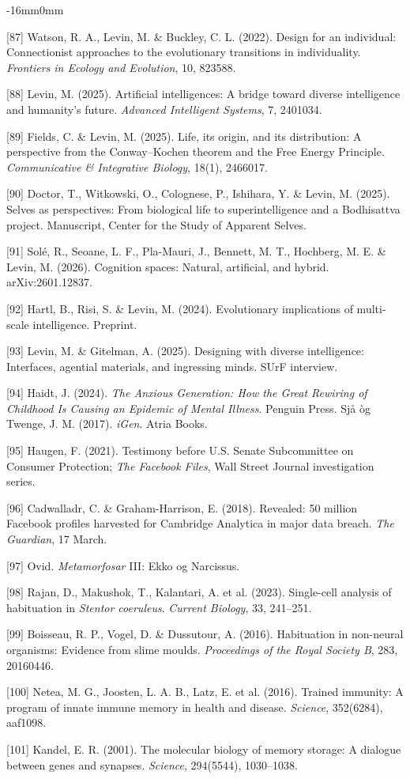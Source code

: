 \documentclass[10pt,oneside]{book}
\newcommand{\refentry}[1]{%
  \par\addvspace{0pt}%
  \begingroup\footnotesize\linespread{0.92}\selectfont
  \noindent\hangindent=4mm\hangafter=1 #1\par%
  \endgroup
}
\newenvironment{widebody}{%
  \begin{adjustwidth}{-16mm}{0mm}%
}{%
  \end{adjustwidth}%
}
\begin{document}
\begin{widebody}
\refentry{[87] Watson, R. A., Levin, M. \& Buckley, C. L. (2022). Design for an individual: Connectionist approaches to the evolutionary transitions in individuality. \textit{Frontiers in Ecology and Evolution}, 10, 823588.}
\refentry{[88] Levin, M. (2025). Artificial intelligences: A bridge toward diverse intelligence and humanity's future. \textit{Advanced Intelligent Systems}, 7, 2401034.}
\refentry{[89] Fields, C. \& Levin, M. (2025). Life, its origin, and its distribution: A perspective from the Conway--Kochen theorem and the Free Energy Principle. \textit{Communicative \& Integrative Biology}, 18(1), 2466017.}
\refentry{[90] Doctor, T., Witkowski, O., Colognese, P., Ishihara, Y. \& Levin, M. (2025). Selves as perspectives: From biological life to superintelligence and a Bodhisattva project. Manuscript, Center for the Study of Apparent Selves.}
\refentry{[91] Sol{\'e}, R., Seoane, L. F., Pla-Mauri, J., Bennett, M. T., Hochberg, M. E. \& Levin, M. (2026). Cognition spaces: Natural, artificial, and hybrid. arXiv:2601.12837.}
\refentry{[92] Hartl, B., Risi, S. \& Levin, M. (2024). Evolutionary implications of multi-scale intelligence. Preprint.}
\refentry{[93] Levin, M. \& Gitelman, A. (2025). Designing with diverse intelligence: Interfaces, agential materials, and ingressing minds. SUrF interview.}
\refentry{[94] Haidt, J. (2024). \textit{The Anxious Generation: How the Great Rewiring of Childhood Is Causing an Epidemic of Mental Illness}. Penguin Press. Sjå òg Twenge, J. M. (2017). \textit{iGen}. Atria Books.}
\refentry{[95] Haugen, F. (2021). Testimony before U.S. Senate Subcommittee on Consumer Protection; \textit{The Facebook Files}, Wall Street Journal investigation series.}
\refentry{[96] Cadwalladr, C. \& Graham-Harrison, E. (2018). Revealed: 50 million Facebook profiles harvested for Cambridge Analytica in major data breach. \textit{The Guardian}, 17 March.}
\refentry{[97] Ovid. \textit{Metamorfosar} III: Ekko og Narcissus.}
\refentry{[98] Rajan, D., Makushok, T., Kalantari, A. et al. (2023). Single-cell analysis of habituation in \textit{Stentor coeruleus}. \textit{Current Biology}, 33, 241--251.}
\refentry{[99] Boisseau, R. P., Vogel, D. \& Dussutour, A. (2016). Habituation in non-neural organisms: Evidence from slime moulds. \textit{Proceedings of the Royal Society B}, 283, 20160446.}
\refentry{[100] Netea, M. G., Joosten, L. A. B., Latz, E. et al. (2016). Trained immunity: A program of innate immune memory in health and disease. \textit{Science}, 352(6284), aaf1098.}
\refentry{[101] Kandel, E. R. (2001). The molecular biology of memory storage: A dialogue between genes and synapses. \textit{Science}, 294(5544), 1030--1038.}

\end{widebody}
\end{document}
